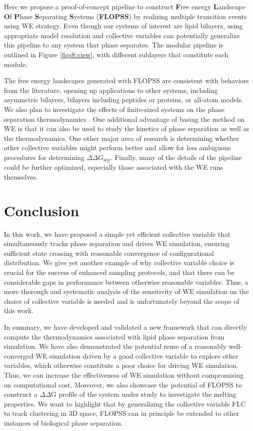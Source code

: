 \documentclass{biophys-new}
\begin{document}
Here we propose a proof-of-concept pipeline to construct \textbf{F}ree energy \textbf{L}andscape \textbf{O}f \textbf{P}hase \textbf{S}eparating \textbf{S}ystems (\textbf{FLOPSS}) by realizing multiple transition events using WE strategy.
Even though our systems of interest are lipid bilayers, using appropriate model resolution and collective variables can potentially generalize this pipeline to any system that phase separates.
The modular pipeline is outlined in Figure \ref{figs8:view}, with different sublayers that constitute each module.

The free energy landscapes generated with FLOPSS are consistent with behaviors from the literature, opening up applications to other systems, including asymmetric bilayers, bilayers including peptides or proteins, or all-atom models. We also plan to investigate the effects of finite-sized systems on the phase separation thermodynamics \cite{Pantelopulos2017}. One additional advantage of basing the method on WE is that it can also be used to study the kinetics of phase separation as well as the thermodynamics. One other major area of research is determining whether other collective variables might perform better and allow for less ambiguous procedures for determining $\Delta\Delta G_\text{sep}$. Finally, many of the details of the pipeline could be further optimized, especially those associated with the WE runs themselves.

\section*{Conclusion}

In this work, we have proposed a simple yet efficient collective variable that
simultaneously tracks phase separation and drives WE simulation, ensuring
sufficient state crossing with reasonable convergence of configurational
distribution. We give yet another example of why collective variable choice is
crucial for the success of enhanced sampling protocols, and that there can be
considerable gaps in performance between otherwise reasonable variables. Thus,
a more thorough and systematic analysis of the sensitivity of WE simulation on
the choice of collective variable is needed and is unfortunately beyond the
scope of this work.

In summary, we have developed and validated a new framework that can directly compute the thermodynamics associated with lipid phase separation from simulation.
We have also demonstrated the potential reuse of a reasonably well-converged WE simulation driven by a good collective variable to explore other variables, which otherwise constitute a poor choice for driving WE simulation.
Thus, we can increase the effectiveness of WE simulation without compromising on computational cost.
Moreover, we also showcase the potential of FLOPSS to construct a $\Delta\Delta$G profile of the system under study to investigate the melting properties.
We want to highlight that by generalizing the collective variable FLC to track clustering in 3D space, FLOPSS can in principle be extended to other instances of biological phase separation.
\end{document}
